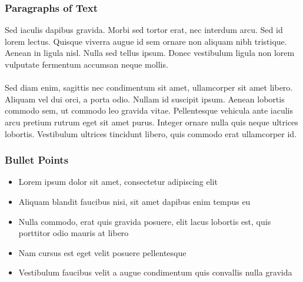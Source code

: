 \documentclass{beamer}
\begin{document}
\begin{frame}
\frametitle{Paragraphs of Text}
Sed iaculis dapibus gravida. Morbi sed tortor erat, nec interdum arcu. Sed id lorem lectus. Quisque viverra augue id sem ornare non aliquam nibh tristique. Aenean in ligula nisl. Nulla sed tellus ipsum. Donec vestibulum ligula non lorem vulputate fermentum accumsan neque mollis.\\~\\

Sed diam enim, sagittis nec condimentum sit amet, ullamcorper sit amet libero. Aliquam vel dui orci, a porta odio. Nullam id suscipit ipsum. Aenean lobortis commodo sem, ut commodo leo gravida vitae. Pellentesque vehicula ante iaculis arcu pretium rutrum eget sit amet purus. Integer ornare nulla quis neque ultrices lobortis. Vestibulum ultrices tincidunt libero, quis commodo erat ullamcorper id.
\end{frame}


\begin{frame}
\frametitle{Bullet Points}
\begin{itemize}
\item Lorem ipsum dolor sit amet, consectetur adipiscing elit
\item Aliquam blandit faucibus nisi, sit amet dapibus enim tempus eu
\item Nulla commodo, erat quis gravida posuere, elit lacus lobortis est, quis porttitor odio mauris at libero
\item Nam cursus est eget velit posuere pellentesque
\item Vestibulum faucibus velit a augue condimentum quis convallis nulla gravida
\end{itemize}
\end{frame}

\end{document}
